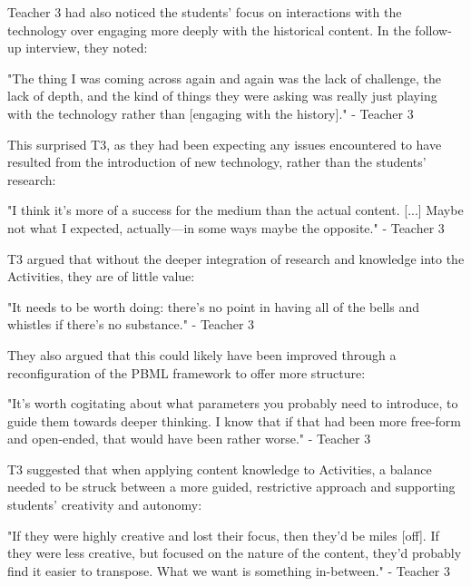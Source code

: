 Teacher 3 had also noticed the students' focus on interactions with the technology over engaging more deeply with the historical content. In the follow-up interview, they noted: 

\begin{displayquote}
"The thing I was coming across again and again was the lack of challenge, the lack of depth, and the kind of things they were asking was really just playing with the technology rather than [engaging with the history]." - Teacher 3
\end{displayquote}

This surprised T3, as they had been expecting any issues encountered to have resulted from the introduction of new technology, rather than the students' research: 

\begin{displayquote}
"I think it's more of a success for the medium than the actual content. [...] Maybe not what I expected, actually---in some ways maybe the opposite." - Teacher 3
\end{displayquote}

T3 argued that without the deeper integration of research and knowledge into the Activities, they are of little value: 

\begin{displayquote}
"It needs to be worth doing: there's no point in having all of the bells and whistles if there's no substance." - Teacher 3
\end{displayquote}

They also argued that this could likely have been improved through a reconfiguration of the PBML framework to offer more structure: 

\begin{displayquote}
"It's worth cogitating about what parameters you probably need to introduce, to guide them towards deeper thinking. I know that if that had been more free-form and open-ended, that would have been rather worse." - Teacher 3
\end{displayquote}

T3 suggested that when applying content knowledge to Activities, a balance needed to be struck between a more guided, restrictive approach and supporting students' creativity and autonomy:

\begin{displayquote}
"If they were highly creative and lost their focus, then they'd be miles [off]. If they were less creative, but focused on the nature of the content, they'd probably find it easier to transpose. What we want is something in-between." - Teacher 3
\end{displayquote}

